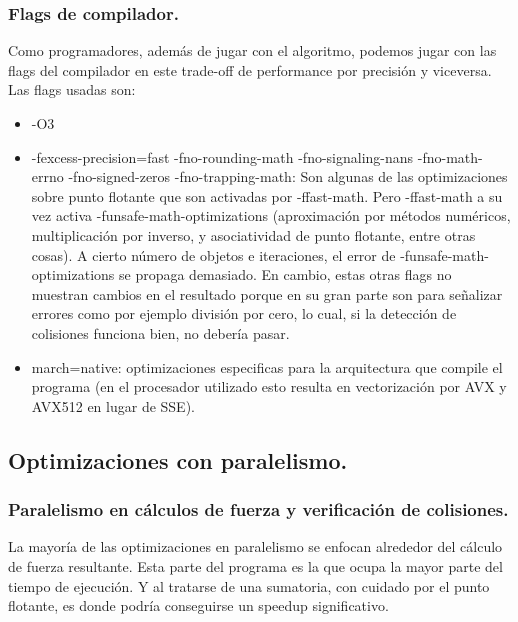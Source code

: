 \documentclass{article}
\begin{document}
\subsubsection{Flags de compilador.\label{compiler}}
Como programadores, además de jugar con el algoritmo, podemos jugar con las flags
del compilador en este trade-off de performance por precisión y viceversa.
Las flags usadas son:
\begin{itemize}
		\item -O3
		\item -fexcess-precision=fast -fno-rounding-math -fno-signaling-nans
			-fno-math-errno -fno-signed-zeros -fno-trapping-math: Son algunas de las optimizaciones
			sobre punto flotante que son activadas por -ffast-math. Pero -ffast-math
			a su vez activa -funsafe-math-optimizations (aproximación por métodos numéricos, multiplicación por inverso, y asociatividad
			de punto flotante, entre otras cosas). A cierto número de objetos e iteraciones, el error
			de -funsafe-math-optimizations se propaga demasiado. En cambio, estas otras flags no muestran cambios en el resultado porque en su
			gran parte son para señalizar errores como por ejemplo división por cero, lo cual, si la detección
			de colisiones funciona bien, no debería pasar.
		\item march=native: optimizaciones especificas para la arquitectura que compile el programa (en el procesador
			utilizado esto resulta en vectorización por AVX y AVX512 en lugar de SSE).
\end{itemize}

\subsection{Optimizaciones con paralelismo.\label{opt_parallel}}
\subsubsection{Paralelismo en cálculos de fuerza y verificación de colisiones.}
La mayoría de las optimizaciones en paralelismo se enfocan alrededor del cálculo de fuerza resultante.
Esta parte del programa es la que ocupa la mayor parte del tiempo de ejecución. Y al tratarse de una sumatoria,
con cuidado por el punto flotante, es donde podría conseguirse un speedup significativo.
\end{document}
